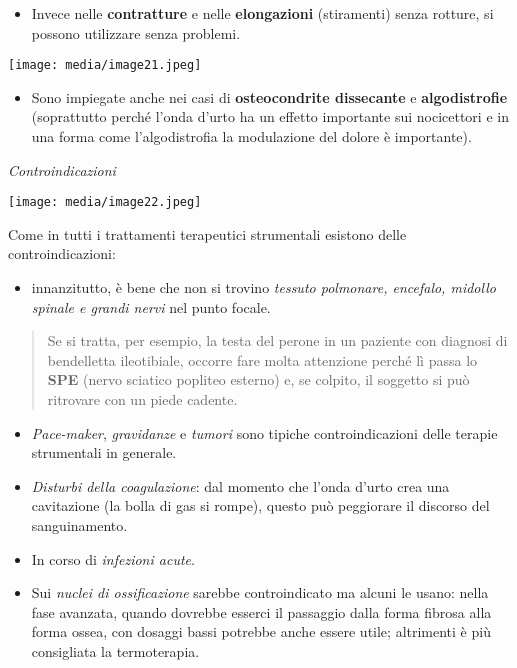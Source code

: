 \documentclass[]{article}
\begin{document}
\begin{itemize}
\item
  Invece nelle \textbf{contratture} e nelle \textbf{elongazioni}
  (stiramenti) senza rotture, si possono utilizzare senza problemi.
\end{itemize}

\texttt{[image: media/image21.jpeg]}

\begin{itemize}
\item
  Sono impiegate anche nei casi di \textbf{osteocondrite dissecante} e
  \textbf{algodistrofie} (soprattutto perché l'onda d'urto ha un effetto
  importante sui nocicettori e in una forma come l'algodistrofia la
  modulazione del dolore è importante).
\end{itemize}

\emph{Controindicazioni}

\texttt{[image: media/image22.jpeg]}

Come in tutti i trattamenti terapeutici strumentali esistono delle
controindicazioni:

\begin{itemize}
\item
  innanzitutto, è bene che non si trovino \emph{tessuto polmonare,
  encefalo, midollo spinale e grandi nervi} nel punto focale.
\end{itemize}

\begin{quote}
Se si tratta, per esempio, la testa del perone in un paziente con
diagnosi di bendelletta ileotibiale, occorre fare molta attenzione
perché lì passa lo \textbf{SPE} (nervo sciatico popliteo esterno) e, se
colpito, il soggetto si può ritrovare con un piede cadente.
\end{quote}

\begin{itemize}
\item
  \emph{Pace-maker}, \emph{gravidanze} e \emph{tumori} sono tipiche
  controindicazioni delle terapie strumentali in generale.
\item
  \emph{Disturbi della coagulazione}: dal momento che l'onda d'urto crea
  una cavitazione (la bolla di gas si rompe), questo può peggiorare il
  discorso del sanguinamento.
\item
  In corso di \emph{infezioni acute}.
\item
  Sui \emph{nuclei di ossificazione} sarebbe controindicato ma alcuni le
  usano: nella fase avanzata, quando dovrebbe esserci il passaggio dalla
  forma fibrosa alla forma ossea, con dosaggi bassi potrebbe anche
  essere utile; altrimenti è più consigliata la termoterapia.
\end{itemize}
\end{document}
